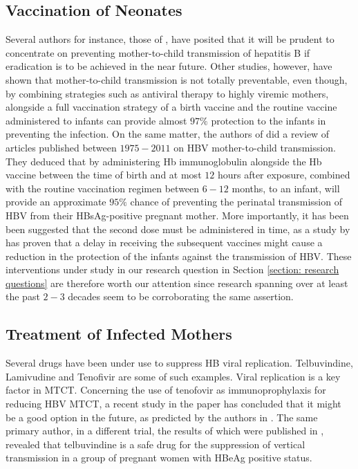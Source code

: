 \subsection{Vaccination of Neonates}
Several authors for instance, those of \cite{tran2009management,andersson2015mother, xu2013nextstep,shimakawa2016mother}, have posited that it will be prudent to concentrate on preventing mother-to-child transmission of hepatitis B if eradication is to be achieved in the near future. Other studies, however, have shown that mother-to-child transmission is not totally preventable, even though, by combining strategies such as antiviral therapy to highly viremic mothers, alongside a full vaccination strategy of a birth vaccine and the routine vaccine administered to infants can provide almost $97\%$ protection to the infants\cite{tran2009management} in preventing the infection. On the same matter, the authors of \cite{Pan2012} did a review of articles published between $1975-2011$ on HBV mother-to-child transmission. They deduced that by administering Hb immunoglobulin alongside the Hb vaccine between the time of birth and at most $12$ hours after exposure, combined with the routine vaccination regimen between $6-12$ months, to an infant, will provide an approximate $95\%$ chance of preventing the perinatal transmission of HBV from their HBsAg-positive pregnant mother. More importantly, it has been been suggested that the second dose must be administered in time, as a study by \cite{tharmaphornpilas2009increasedRisk} has proven that a delay in receiving the subsequent vaccines might cause a reduction in the protection of the infants against the transmission of HBV. 
These interventions under study in our research question in Section \ref{section: research questions} are therefore worth our attention since research spanning over at least the past $2-3$ decades seem to be corroborating the same assertion. 

\subsection{Treatment of Infected Mothers}
Several drugs have been under use to suppress HB viral replication. Telbuvindine, Lamivudine and Tenofivir are some of such examples. Viral replication is a key factor in MTCT. Concerning the use of tenofovir as immunoprophylaxis for reducing HBV MTCT, a recent study in the paper \cite{pan2016TenofivirToPrevent} has concluded that it might be a good option in the future, as predicted by the authors in \cite{xu2013nextstep}. The same primary author, in a different trial, the results of which were published in \cite{pan2012telbivudine}, revealed that telbuvindine is a safe drug for the suppression of vertical transmission in a group of pregnant women with HBeAg positive status.